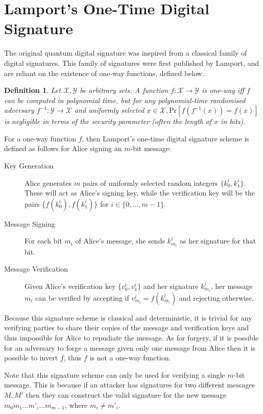 \documentclass[%
 reprint,
 amsmath,amssymb,
 aps,
 pra,
]{revtex4-1}
\newtheorem{definition}{Definition}[section]
\begin{document}
\section{Lamport's One-Time Digital Signature}

The original quantum digital signature was inspired from a classical family of digital signatures. This family of signatures were first published by Lamport\cite{lamp79}, and are reliant on the existence of one-way functions, defined below.

\begin{definition}
Let $\mathcal{X}, \mathcal{Y}$ be arbitrary sets. A function $f:\mathcal{X} \rightarrow \mathcal{Y}$ is one-way iff $f$ can be computed in polynomial time, but for any polynomial-time randomised adversary $f^{-1}:\mathcal{Y} \rightarrow \mathcal{X}$ and uniformly selected $x \in \mathcal{X}, \mathrm{Pr}[f(f^{-1}(x)) = f(x)]$ is negligible in terms of the security parameter (often the length of $x$ in bits).
\end{definition}

For a one-way function $f$, then Lamport's one-time digital signature scheme is defined as follows for Alice signing an $m$-bit message:

\begin{description}
\item[Key Generation]Alice generates $m$ pairs of uniformly selected random integers $\{k^i_0, k^i_1\}$. These will act as Alice's signing key, while the verification key will be the pairs $\{f(k^i_0), f(k^i_1)\}$ for $i \in \{0,...,m-1\}$.
\item[Message Signing]For each bit $m_i$ of Alice's message, she sends $k^i_{m_i}$ as her signature for that bit.
\item[Message Verification]Given Alice's verification key $\{v^i_0, v^i_1\}$ and her signature $k^i_{m_i}$, her message $m_i$ can be verified by accepting if $v^i_{m_i} = f(k^i_{m_i})$ and rejecting otherwise.
\end{description}

Because this signature scheme is classical and deterministic, it is trivial for any verifying parties to share their copies of the message and verification keys and thus impossible for Alice to repudiate the message. As for forgery, if it is possible for an adversary to forge a message given only one message from Alice then it is possible to invert $f$, thus $f$ is not a one-way function.

Note that this signature scheme can only be used for verifying a single $m$-bit message. This is because if an attacker has signatures for two different messages $M, M'$ then they can construct the valid signature for the new message $m_0m_1...m'_i...m_{m-1}$, where $m_i \neq m'_i$.
\end{document}
